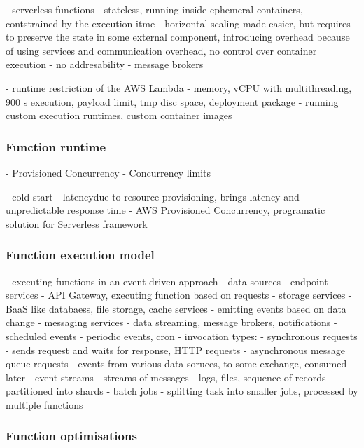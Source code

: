 \label{chapter:serverless-processing-limitations-runtime-and-data-restrictions}
- serverless functions - stateless, running inside ephemeral containers, contstrained by the execution itme - horizontal scaling made easier, but requires to preserve the state in some external component, introducing overhead because of using services and communication overhead, no control over container execution - no addresability - message brokers

- runtime restriction of the AWS Lambda - memory, vCPU with multithreading, 900 s execution, payload limit, tmp disc space, deployment package
- running custom execution runtimes, custom container images

\subsubsection{Function runtime} \label{chapter:lambda-custom-runtimes}

- Provisioned Concurrency
- Concurrency limits

\label{chapter:serverless-suitability-processing-time}
- cold start - latencydue to resource provisioning, brings latency and unpredictable response time
- AWS Provisioned Concurrency, programatic solution for Serverless framework

\subsubsection{Function execution model}

\label{section:serverless-function-invocation}
- executing functions in an event-driven approach
- data sources
    - endpoint services - API Gateway, executing function based on requests
    - storage services - BaaS like databaess, file storage, cache services - emitting events based on data change
    - messaging services - data streaming, message brokers, notifications
    - scheduled events - periodic events, cron
- invocation types:
    - synchronous requests - sends request and waits for response, HTTP requests
    - asynchronous message queue requests - events from various data soruces, to some exchange, consumed later
    - event streams - streams of messages - logs, files, sequence of records partitioned into shards
    - batch jobs - splitting task into smaller jobs, processed by multiple functions

\subsubsection{Function optimisations}

